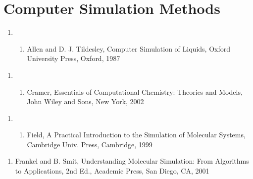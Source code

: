 \documentclass[letterpaper,11pt,english]{sphinxmanual}
\begin{document}
\section{Computer Simulation Methods}
\label{\detokenize{text/references:computer-simulation-methods}}\begin{enumerate}
%
\setcounter{enumi}{12}
\item {} \begin{enumerate}
%
\setcounter{enumii}{15}
\item {} 
Allen and D. J. Tildesley, Computer Simulation of Liquids, Oxford University Press, Oxford, 1987

\end{enumerate}

\end{enumerate}
\begin{enumerate}
%
\setcounter{enumi}{2}
\item {} \begin{enumerate}
%
\setcounter{enumii}{9}
\item {} 
Cramer, Essentials of Computational Chemistry: Theories and Models, John Wiley and Sons, New York, 2002

\end{enumerate}

\end{enumerate}
\begin{enumerate}
%
\setcounter{enumi}{12}
\item {} \begin{enumerate}
%
\setcounter{enumii}{9}
\item {} 
Field, A Practical Introduction to the Simulation of Molecular Systems, Cambridge Univ. Press, Cambridge, 1999

\end{enumerate}

\end{enumerate}
\begin{enumerate}
%
\setcounter{enumi}{3}
\item {} 
Frankel and B. Smit, Understanding Molecular Simulation: From Algorithms to Applications, 2nd Ed., Academic Press, San Diego, CA, 2001

\end{enumerate}
\end{document}
